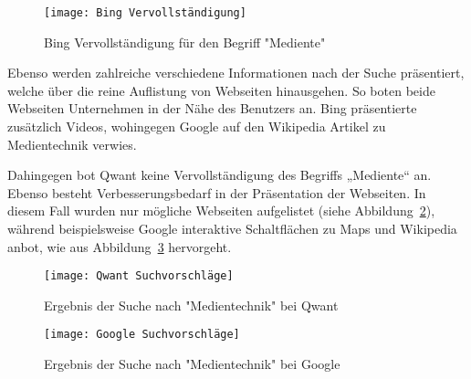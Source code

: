 \begin{figure}[ht]
    \centering
    \texttt{[image: Bing Vervollständigung]}
    \caption{Bing Vervollständigung für den Begriff "Mediente"}
    \label{fig:bingvervollstandigung}
\end{figure}

Ebenso werden zahlreiche verschiedene Informationen nach der Suche präsentiert, welche über die reine Auflistung von Webseiten hinausgehen.
So boten beide Webseiten Unternehmen in der Nähe des Benutzers an.
Bing präsentierte zusätzlich Videos, wohingegen Google auf den Wikipedia Artikel zu Medientechnik verwies.

Dahingegen bot Qwant keine Vervollständigung des Begriffs „Mediente“ an.
Ebenso besteht Verbesserungsbedarf in der Präsentation der Webseiten.
In diesem Fall wurden nur mögliche Webseiten aufgelistet (siehe Abbildung~\ref{fig:qwantvorschlage}), während beispielsweise Google
interaktive Schaltflächen zu Maps und Wikipedia anbot, wie aus Abbildung~\ref{fig:googlevorschlage} hervorgeht.
\begin{figure}[ht]
    \centering
    \texttt{[image: Qwant Suchvorschläge]}
    \caption{Ergebnis der Suche nach "Medientechnik" bei Qwant}
    \label{fig:qwantvorschlage}
\end{figure}

\begin{figure}[ht]
    \centering
    \texttt{[image: Google Suchvorschläge]}
    \caption{Ergebnis der Suche nach "Medientechnik" bei Google}
    \label{fig:googlevorschlage}
\end{figure}
